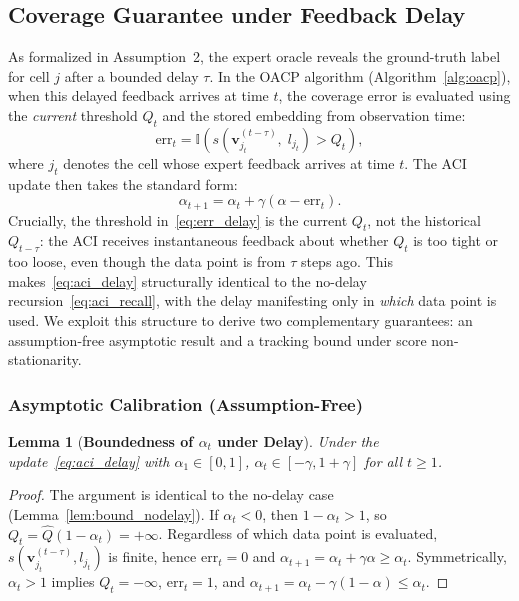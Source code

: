 \documentclass[letterpaper, 10 pt, conference]{ieeeconf}  %
\newtheorem{mylem}{\bf Lemma}
\begin{document}
\subsection{Coverage Guarantee under Feedback Delay}
\label{subsec:convergence_delay}

As formalized in Assumption~2, the expert oracle reveals the ground-truth label for cell $j$ after a bounded delay $\tau$. In the OACP algorithm (Algorithm~\ref{alg:oacp}), when this delayed feedback arrives at time $t$, the coverage error is evaluated using the \emph{current} threshold $Q_t$ and the stored embedding from observation time:
\begin{equation}
    \text{err}_t = \mathbb{I}\!\left( s\!\left(\mathbf{v}_{j_t}^{(t-\tau)},\; l_{j_t}\right) > Q_t \right),
    \label{eq:err_delay}
\end{equation}
where $j_t$ denotes the cell whose expert feedback arrives at time $t$. The ACI update then takes the standard form:
\begin{equation}
    \alpha_{t+1} = \alpha_t + \gamma(\alpha - \text{err}_t).
    \label{eq:aci_delay}
\end{equation}
Crucially, the threshold in~\eqref{eq:err_delay} is the current $Q_t$, not the historical $Q_{t-\tau}$: the ACI receives instantaneous feedback about whether $Q_t$ is too tight or too loose, even though the data point is from $\tau$ steps ago. This makes~\eqref{eq:aci_delay} structurally identical to the no-delay recursion~\eqref{eq:aci_recall}, with the delay manifesting only in \emph{which} data point is used. We exploit this structure to derive two complementary guarantees: an assumption-free asymptotic result and a tracking bound under score non-stationarity.

\subsubsection{Asymptotic Calibration (Assumption-Free)}

\begin{mylem}[\textbf{Boundedness of $\alpha_t$ under Delay}]
\label{lem:bound_delay}
Under the update~\eqref{eq:aci_delay} with $\alpha_1 \in [0,1]$, $\alpha_t \in [-\gamma, 1+\gamma]$ for all $t \ge 1$.
\end{mylem}

\begin{proof}
The argument is identical to the no-delay case (Lemma~\ref{lem:bound_nodelay}). If $\alpha_t < 0$, then $1-\alpha_t > 1$, so $Q_t = \hat{Q}(1-\alpha_t) = +\infty$. Regardless of which data point is evaluated, $s(\mathbf{v}_{j_t}^{(t-\tau)}, l_{j_t})$ is finite, hence $\text{err}_t = 0$ and $\alpha_{t+1} = \alpha_t + \gamma\alpha \ge \alpha_t$. Symmetrically, $\alpha_t > 1$ implies $Q_t = -\infty$, $\text{err}_t = 1$, and $\alpha_{t+1} = \alpha_t - \gamma(1-\alpha) \le \alpha_t$.
\end{proof}
\end{document}
